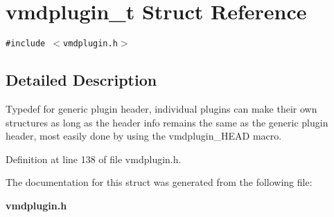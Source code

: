 \section{vmdplugin\_\-t  Struct Reference}
\label{structvmdplugin__t}
{\tt \#include $<$vmdplugin.h$>$}



\subsection{Detailed Description}
Typedef for generic plugin header, individual plugins can make their own structures as long as the header info remains  the same as the generic plugin header, most easily done by  using the vmdplugin\_\-HEAD macro. 



Definition at line 138 of file vmdplugin.h.

The documentation for this struct was generated from the following file:\begin{CompactItemize}
\item 
{\bf vmdplugin.h}\end{CompactItemize}
